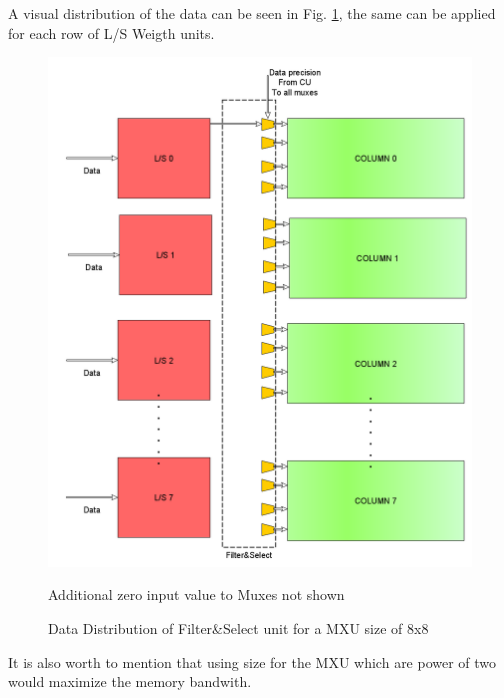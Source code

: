 A visual distribution of the data can be seen in Fig. \ref{fig:fscs}, the same can be applied for each row of L/S Weigth units.
\begin{figure}[H]
\centering
\captionsetup{justification=centering}
\includegraphics[scale=0.35,angle=0]{./figure/filter_and_select.png}
\caption{Data Distribution of Filter\&Select unit for a MXU size of 8x8
}
  \small Additional zero input value to Muxes not shown
\label{fig:fscs}
\end{figure} 

It is also worth to mention that using size for the MXU which are power of two would maximize the memory bandwith.

\newpage
